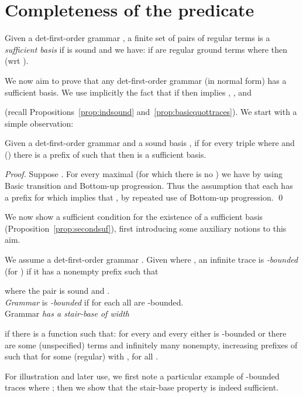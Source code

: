 \documentclass[12pt]{article}
\begin{document}
\section{Completeness of the predicate }
\label{subsec:completeness}



\begin{defn}
Given a det-first-order grammar , a finite set  of pairs 
of regular terms is
a \emph{sufficient basis} if  is sound and 
we have:
if  are regular ground terms where 
then  (wrt ).
\end{defn}
We now aim to prove that any det-first-order grammar (in normal form)
has a sufficient basis.
We use implicitly the fact that if 
then  implies 
, 
,
and 

(recall Propositions~\ref{prop:indsound} and~\ref{prop:basicquottraces}).
We start with a simple observation:

\begin{prop}\label{prop:infininter}
Given a det-first-order grammar  
and a sound basis , 
if for every triple  where
 and  () there is
a prefix  of  such that  then
 is a sufficient basis.
\end{prop}

\begin{proof}
Suppose .
For every maximal  
(for which there is no )
we have  by using 
Basic transition 
and Bottom-up progression. 
Thus the assumption that each 
 has a prefix  
for which  implies that 
, by repeated use of Bottom-up
progression.
\qed
\end{proof}

\noindent
We now show 
a  sufficient condition for the existence
of a sufficient basis (Proposition~\ref{prop:secondsuf}), 
first introducing  some auxiliary notions to this aim.



\begin{defn}
We assume a det-first-order grammar . 
Given  where  
, an infinite trace   
is \emph{-bounded} (for )
if it has a nonempty
prefix  such that
 
where 
the pair  is sound and 
.  
\\
\emph{Grammar}  is \emph{-bounded} 
if for each
 all   are -bounded.
\\
Grammar  \emph{has a stair-base of width}
 
if 
there is a function  such that: 
for every  
and every 
either  is -bounded or there are 
some (unspecified) terms 
and infinitely
many nonempty, increasing prefixes  of  such
that 
for some (regular)  with
, for all .
\end{defn}
For illustration and later use, we
first note a particular example of -bounded traces where
; then we show
that the stair-base property is indeed sufficient.
\end{document}
